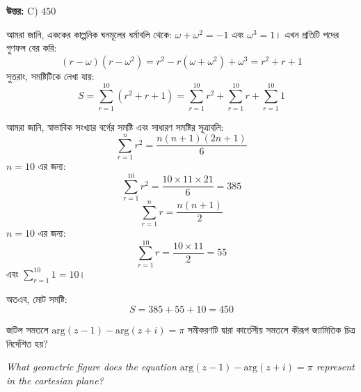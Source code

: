 \documentclass[12pt, a4paper]{article}
\begin{document}
\vspace{0.5em}
\begin{tcolorbox}[answerbox]
    \textbf{\color{success} উত্তর:} C) $450$
\end{tcolorbox}
\vspace{1em}

\begin{tcolorbox}[solutionbox={সমাধান (Solution)}]
    \noindent
    আমরা জানি, এককের কাল্পনিক ঘনমূলের ধর্মাবলি থেকে: $\omega + \omega^2 = -1$ এবং $\omega^3 = 1$। 
    এখন প্রতিটি পদের গুণফল বের করি:
    \[ (r - \omega)(r - \omega^2) = r^2 - r(\omega + \omega^2) + \omega^3 = r^2 + r + 1 \]
    সুতরাং, সমষ্টিটিকে লেখা যায়:
    \[ S = \sum_{r=1}^{10} (r^2 + r + 1) = \sum_{r=1}^{10} r^2 + \sum_{r=1}^{10} r + \sum_{r=1}^{10} 1 \]
    
    \vspace{0.5em}
    আমরা জানি, স্বাভাবিক সংখ্যার বর্গের সমষ্টি এবং সাধারণ সমষ্টির সূত্রাবলি:
    \[ \sum_{r=1}^{n} r^2 = \frac{n(n+1)(2n+1)}{6} \]
    $n = 10$ এর জন্য:
    \[ \sum_{r=1}^{10} r^2 = \frac{10 \times 11 \times 21}{6} = 385 \]
    \[ \sum_{r=1}^{n} r = \frac{n(n+1)}{2} \]
    $n = 10$ এর জন্য:
    \[ \sum_{r=1}^{10} r = \frac{10 \times 11}{2} = 55 \]
    এবং $\sum_{r=1}^{10} 1 = 10$। 
    
    \vspace{0.5em}
    অতএব, মোট সমষ্টি:
    \[ S = 385 + 55 + 10 = 450 \]
\end{tcolorbox}

\vspace{1.5em}

\begin{tcolorbox}[questionbox={প্রশ্ন (Question) 15}]
    \noindent
    জটিল সমতলে $\text{arg}(z - 1) - \text{arg}(z + i) = \pi$ সমীকরণটি দ্বারা কার্তেসীয় সমতলে কীরূপ জ্যামিতিক চিত্র নির্দেশিত হয়?
    
    \vspace{0.8em}
    \begin{english}
    \noindent\textit{\color{darkgray}
    What geometric figure does the equation $\text{arg}(z - 1) - \text{arg}(z + i) = \pi$ represent in the cartesian plane?
    }
    \end{english}
\end{tcolorbox}
\end{document}
